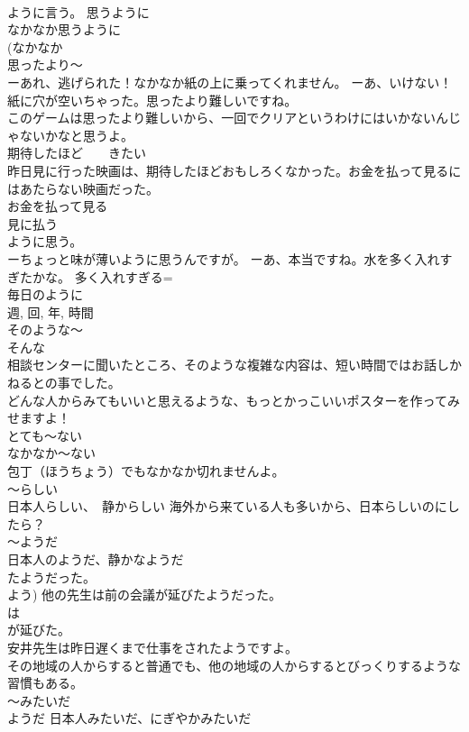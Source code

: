 \documentclass[8pt]{extreport}
\begin{document}
\begin{CJK}{UTF8}{min}
\\	ように言う。 思うように 
\\	なかなか思うように
\\	(なかなか 
\\	思ったより～ 
\\	ーあれ、逃げられた！なかなか紙の上に乗ってくれません。 ーあ、いけない！紙に穴が空いちゃった。思ったより難しいですね。 
\\	このゲームは思ったより難しいから、一回でクリアというわけにはいかないんじゃないかなと思うよ。 
\\	期待したほど　　きたい 
\\	昨日見に行った映画は、期待したほどおもしろくなかった。お金を払って見るにはあたらない映画だった。 
\\	お金を払って見る
\\	見に払う 
\\	ように思う。 
\\	ーちょっと味が薄いように思うんですが。 ーあ、本当ですね。水を多く入れすぎたかな。 多く入れすぎる=
\\	毎日のように 
\\	週, 回, 年, 時間
\\	そのような～ 
\\	そんな
\\	相談センターに聞いたところ、そのような複雑な内容は、短い時間ではお話しかねるとの事でした。 
\\	どんな人からみてもいいと思えるような、もっとかっこいいポスターを作ってみせますよ！ 
\\	とても～ない	
\\	なかなか～ない 
\\	包丁（ほうちょう）でもなかなか切れませんよ。 
\\	～らしい	
\\	日本人らしい、　静からしい 海外から来ている人も多いから、日本らしいのにしたら？　
\\	～ようだ 
\\	日本人のようだ、静かなようだ 
\\	たようだった。 
\\	よう) 他の先生は前の会議が延びたようだった。 
\\	は
\\	が延びた。 
\\	安井先生は昨日遅くまで仕事をされたようですよ。 
\\	その地域の人からすると普通でも、他の地域の人からするとびっくりするような習慣もある。 
\\	～みたいだ 
\\	ようだ 日本人みたいだ、にぎやかみたいだ　

\end{CJK}
\end{document}
